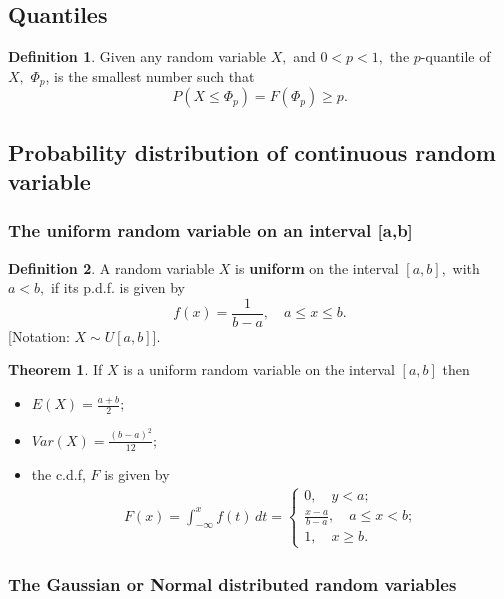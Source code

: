 \documentclass[12pt, a4paper]{article}
\theoremstyle{definition}
\newtheorem{definition}{Definition}[section]
\newtheorem{theorem}{Theorem}[section]
\theoremstyle{plain}
\begin{document}
\subsection{Quantiles}

\begin{definition}
Given any random variable $X,$ and $0 < p < 1,$ the $p$-quantile of $X,$ $\Phi_p$, is the smallest number such that $$P(X\leq \Phi_p)=F(\Phi_p)\geq p.$$
\end{definition}

\subsection{Probability distribution of continuous random variable}

\subsubsection{The uniform random variable on an interval [a,b]}

\begin{definition}
A random variable $X$ is \textbf{uniform} on the interval $[a, b],$ with $a < b,$ if its p.d.f. is given by $$f(x)=\frac{1}{b-a}, \quad a\leq x\leq b.$$
[Notation: $X\sim U[a,b]$].
\end{definition}

\begin{theorem}
If $X$ is a uniform random variable on the interval $[a, b]$ then \begin{itemize}

	\item $E(X)=\frac{a+b}{2};$
	\item $Var(X)=\frac{(b-a)^2}{12};$
	\item the c.d.f, $F$ is given by $$\begin{aligned}
F(x)=\int_{-\infty}^{x} f(t) \,dt=\begin{cases}
0, \quad y<a; \\
\frac{x-a}{b-a}, \quad a\leq x<b; \\
1, \quad x\geq b.
\end{cases}
\end{aligned}$$

\end{itemize}
\end{theorem}

\subsubsection{The Gaussian or Normal distributed random variables}
\end{document}
